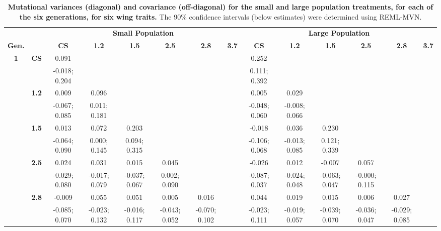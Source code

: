 \FloatBarrier
\begin{landscape}
\begin{table}[!htp]
\renewcommand{\arraystretch}{0.8}
\scriptsize
\caption[Mutational variances (diagonal) and covariance (off-diagonal) for the small and large population treatments, for each of the six generations, for six wing traits.]{\textbf{Mutational variances (diagonal) and covariance (off-diagonal) for the small and large population treatments, for each of the six generations, for six wing traits.}  The 90\% confidence intervals (below estimates) were determined using REML-MVN.}
\label{tab:multi_suppMmat}
\begin{center}
\begin{tabular}{>{\bfseries}c>{\bfseries}ccccccccccccc}
\toprule
&& \multicolumn{6}{c}{\textbf{Small Population}} & \multicolumn{6}{c}{\textbf{Large Population}}\\ [1.25ex]
Gen. && \textbf{CS} & \textbf{1.2} & \textbf{1.5} & \textbf{2.5} & \textbf{2.8} & \textbf{3.7} & 
\textbf{CS} & \textbf{1.2} & \textbf{1.5} & \textbf{2.5} & \textbf{2.8} & \textbf{3.7}\\
\midrule
1 & CS & 0.091 &  &  &  &  &  & 0.252 &  &  &  &  & \\
 &  & -0.018; 0.204 &  &  &  &  &  & 0.111; 0.392 &  &  &  &  & \\[0.7ex]
 & 1.2 & 0.009 & 0.096 &  &  &  &  & 0.005 & 0.029 &  &  &  & \\
 &  & -0.067; 0.085 & 0.011; 0.181 &  &  &  &  & -0.048; 0.060 & -0.008; 0.066 &  &  &  & \\[0.7ex]
 & 1.5 & 0.013 & 0.072 & 0.203 &  &  &  & -0.018 & 0.036 & 0.230 &  &  & \\
 &  & -0.064; 0.090 & 0.000; 0.145 & 0.094; 0.315 &  &  &  & -0.106; 0.068 & -0.013; 0.085 & 0.121; 0.339 &  &  & \\[0.7ex]
 & 2.5 & 0.024 & 0.031 & 0.015 & 0.045 &  &  & -0.026 & 0.012 & -0.007 & 0.057 &  & \\
 &  & -0.029; 0.080 & -0.017; 0.079 & -0.037; 0.067 & 0.002; 0.090 &  &  & -0.087; 0.037 & -0.024; 0.048 & -0.063; 0.047 & -0.000; 0.115 &  & \\[0.7ex]
 & 2.8 & -0.009 & 0.055 & 0.051 & 0.005 & 0.016 &  & 0.044 & 0.019 & 0.015 & 0.006 & 0.027 & \\
 &  & -0.085; 0.070 & -0.023; 0.132 & -0.016; 0.117 & -0.043; 0.052 & -0.070; 0.102 &  & -0.023; 0.111 & -0.019; 0.057 & -0.039; 0.070 & -0.036; 0.047 & -0.029; 0.085 & \\[0.7ex]

\end{tabular}
\end{center}
\end{table}
\end{landscape}
